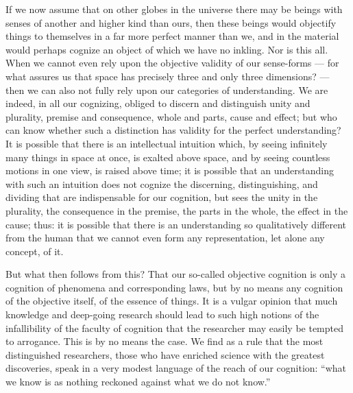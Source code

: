 \documentclass[12pt]{book}
\begin{document}
If we now assume that on other globes in the universe there may be beings with
senses of another and higher kind than ours, then these beings would
objectify things to themselves in a far more perfect manner than we, and in
the material would perhaps cognize an object of which we have no inkling. Nor
is this all. When we cannot even rely upon the objective validity of our
sense-forms --- for what assures us that space has precisely three and only
three dimensions? --- then we can also not fully rely upon our categories of
understanding. We are indeed, in all our cognizing, obliged to discern and
distinguish unity and plurality, premise and consequence, whole and parts,
cause and effect; but who can know whether such a distinction has validity for
the perfect understanding? It is possible that there is an intellectual
intuition which, by seeing infinitely many things in space at once, is exalted
above space, and by seeing countless motions in one view, is raised above
time; it is possible that an understanding with such an intuition does not
cognize the discerning, distinguishing, and dividing that are indispensable
for our cognition, but sees the unity in the plurality, the consequence in the
premise, the parts in the whole, the effect in the cause; thus: it is possible
that there is an understanding so qualitatively different from the human that
we cannot even form any representation, let alone any concept, of it.

But what then follows from this? That our so-called objective cognition is only
a cognition of phenomena and corresponding laws, but by no means any cognition
of the objective itself, of the essence of things. It is a vulgar opinion that
much knowledge and deep-going research should lead to such high notions of the
infallibility of the faculty of cognition that the researcher may easily be
tempted to arrogance. This is by no means the case. We find as a rule that the
most distinguished researchers, those who have enriched science with the
greatest discoveries, speak in a very modest language of the reach of our
cognition: ``what we know is as nothing reckoned against what we do not know.''
\end{document}
